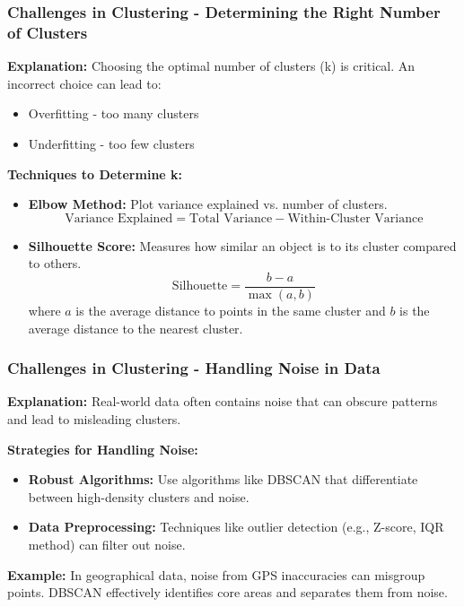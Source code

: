 \documentclass{beamer}
\begin{document}
\begin{frame}[fragile]
    \frametitle{Challenges in Clustering - Determining the Right Number of Clusters}
    
    \textbf{Explanation:} Choosing the optimal number of clusters (k) is critical. An incorrect choice can lead to:
    \begin{itemize}
        \item Overfitting - too many clusters
        \item Underfitting - too few clusters
    \end{itemize}
    
    \textbf{Techniques to Determine k:}
    \begin{itemize}
        \item \textbf{Elbow Method:} Plot variance explained vs. number of clusters.
        \begin{equation}
            \text{Variance Explained} = \text{Total Variance} - \text{Within-Cluster Variance}
        \end{equation}
        
        \item \textbf{Silhouette Score:} Measures how similar an object is to its cluster compared to others.
        \begin{equation}
            \text{Silhouette} = \frac{b - a}{\max(a, b)}
        \end{equation}
        where \( a \) is the average distance to points in the same cluster and \( b \) is the average distance to the nearest cluster.
    \end{itemize}
\end{frame}

\begin{frame}[fragile]
    \frametitle{Challenges in Clustering - Handling Noise in Data}
    
    \textbf{Explanation:} Real-world data often contains noise that can obscure patterns and lead to misleading clusters.
    
    \textbf{Strategies for Handling Noise:}
    \begin{itemize}
        \item \textbf{Robust Algorithms:} Use algorithms like DBSCAN that differentiate between high-density clusters and noise.
        \item \textbf{Data Preprocessing:} Techniques like outlier detection (e.g., Z-score, IQR method) can filter out noise.
    \end{itemize}

    \textbf{Example:} In geographical data, noise from GPS inaccuracies can misgroup points. DBSCAN effectively identifies core areas and separates them from noise.
\end{frame}
\end{document}
